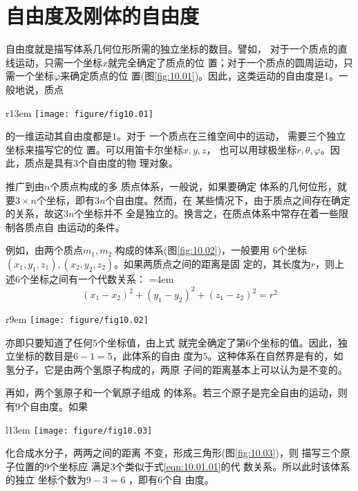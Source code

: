 \documentclass[../outline-of-mechanics.tex]{subfiles}
\begin{document}
\section{自由度及刚体的自由度}\label{sec:10.01}

自由度就是描写体系几何位形所需的独立坐标的数目。譬如，
对于一个质点的直线运动，只需一个坐标$ x $就完全确定了质点的位
置；对于一个质点的圆周运动，只需一个坐标$ \varphi $来确定质点的位
置(图\ref{fig:10.01})。因此，这类运动的自由度是1。一般地说，质点
\begin{wrapfigure}[9]{r}{13em}
  \centering
  \texttt{[image: figure/fig10.01]}
  \caption{一维运动}
  \label{fig:10.01}
\end{wrapfigure}
的一维运动其自由度都是$ 1 $。对于
一个质点在三维空间中的运动，
需要三个独立坐标来描写它的位
置。可以用笛卡尔坐标$ x,y,z $，
也可以用球极坐标$ r, \theta , \varphi $。因
此，质点是具有$ 3 $个自由度的物
理对象。

推广到由$ n $个质点构成的多
质点体系，一般说，如果要确定
体系的几何位形，就要$ 3 \times n $个坐标，即有$ 3n $个自由度。然而，在
某些情况下，由于质点之间存在确定的关系，故这$ 3n $个坐标并不
全是独立的。换言之，在质点体系中常存在着一些限制各质点自
由运动的条件。

例如，由两个质点$ m _ 1, m _ { 2 } $ 构成的体系(图\ref{fig:10.02})，一般要用
$ 6 $个坐标$ \left( x _ { 1 } , y _ { 1 } , z _ { 1 } \right) ,\left(x_2,y_2,z_2\right) $。如果两质点之间的距离是固
定的，其长度为$ r $，则上述$ 6 $个坐标之间有一个代数关系：
\begingroup
\mathindent=4em
\begin{equation}\label{eqn:10.01.01}
  \left( x _ { 1 } - x _ { 2 } \right) ^ { 2 } + \left( y _ { 1 } - y _ { 2 } \right) ^ { 2 } + \left( z _ { 1 } - z _ { 2 } \right) ^ { 2 } = r ^ { 2 }
\end{equation}
\endgroup
\begin{wrapfigure}[7]{r}{9em}
  \centering
  \texttt{[image: figure/fig10.02]}
  \caption{两质点体系}
  \label{fig:10.02}
\end{wrapfigure}
亦即只要知道了任何$ 5 $个坐标值，由上式
就完全确定了第$ 6 $个坐标的值。因此，独
立坐标的数目是$ 6-1=5 $，此体系的自由
度为$ 5 $。这种体系在自然界是有的，如
氢分子，它是由两个氢原子构成的，两原
子间的距离基本上可以认为是不变的。

再如，两个氢原子和一个氧原子组成
的体系。若三个原子是完全自由的运动，则有$ 9 $个自由度。如果

\begin{wrapfigure}[7]{l}{13em}
  \centering
  \texttt{[image: figure/fig10.03]}
  \caption{水分子的结构}
  \label{fig:10.03}
\end{wrapfigure}
\noindent
化合成水分子，两两之间的距离
不变，形成三角形(图\ref{fig:10.03})，则
描写三个原子位置的9个坐标应
满足$ 3 $个类似于式\eqref{eqn:10.01.01}的代
数关系。所以此时该体系的独立
坐标个数为$ 9 - 3 = 6 $ ，即有$ 6 $个自
由度。
\end{document}
